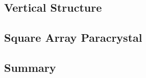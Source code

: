 \documentclass[\main/dresen_thesis.tex]{subfiles}
\renewcommand{\thisPath}{\main/chapters/monolayers/structuralCharacterization}
\begin{document}
  
  \FloatBarrier
  \subsection{Vertical Structure}
    

  \subsection{Square Array Paracrystal}
    

  \subsection{Summary}
    
\end{document}
